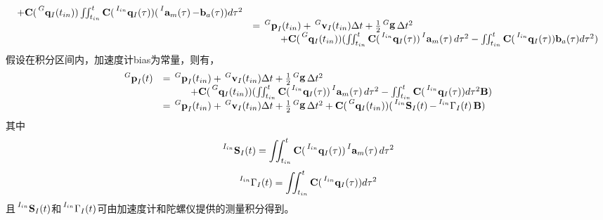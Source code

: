\documentclass{article}
\begin{document}
\begin{equation}
\begin{array}{ll}
        +\textbf{C}(\sideset{^G}{}{\mathop{\mathbf{q}_{I}(t_{in})}})
        \iint_{t_{in}}^{t}\textbf{C}(\sideset{^{I_{in}}}{}{\mathop{\mathbf{q}_{I}(\tau)}})
        (\sideset{^I}{}{\mathop{\mathbf{a}_{m}(\tau)}}-\textbf{b}_{a}(\tau))d{\tau}^2\\
        &=\sideset{^G}{}{\mathop{\textbf{p}_{I}}}(t_{in})+
        \sideset{^G}{}{\mathop{\textbf{v}_{I}}}(t_{in})\Delta{t}
        +\frac{1}{2}\sideset{^G}{}{\mathop{\mathbf{g}}}\Delta{t}^{2}\\
        &\hspace{1cm}+\textbf{C}(\sideset{^G}{}{\mathop{\mathbf{q}_{I}(t_{in})}})
        (\iint_{t_{in}}^{t}\textbf{C}(\sideset{^{I_{in}}}{}{\mathop{\mathbf{q}_{I}(\tau)}})
        \sideset{^I}{}{\mathop{\mathbf{a}_{m}(\tau)}}d{\tau}^2
        -\iint_{t_{in}}^{t}\textbf{C}(\sideset{^{I_{in}}}{}{\mathop{\mathbf{q}_{I}(\tau)}})
        \textbf{b}_{a}(\tau)d{\tau}^2)
    \end{array}
\end{equation}
假设在积分区间内，加速度计bias为常量，则有，
\begin{equation}\label{eqs:imuInG}
    \begin{array}{ll}
        \sideset{^G}{}{\mathop{\textbf{p}_{I}}}(t)
        &=\sideset{^G}{}{\mathop{\textbf{p}_{I}}}(t_{in})+
        \sideset{^G}{}{\mathop{\textbf{v}_{I}}}(t_{in})\Delta{t}
        +\frac{1}{2}\sideset{^G}{}{\mathop{\mathbf{g}}}\Delta{t}^{2}\\
        &\hspace{1cm}+\textbf{C}(\sideset{^G}{}{\mathop{\mathbf{q}_{I}(t_{in})}})
        (\iint_{t_{in}}^{t}\textbf{C}(\sideset{^{I_{in}}}{}{\mathop{\mathbf{q}_{I}(\tau)}})
        \sideset{^I}{}{\mathop{\mathbf{a}_{m}(\tau)}}d{\tau}^2
        -\iint_{t_{in}}^{t}\textbf{C}(\sideset{^{I_{in}}}{}{\mathop{\mathbf{q}_{I}(\tau)}})
        d{\tau}^2\textbf{B})\\
        &=\sideset{^G}{}{\mathop{\textbf{p}_{I}}}(t_{in})+
        \sideset{^G}{}{\mathop{\textbf{v}_{I}}}(t_{in})\Delta{t}
        +\frac{1}{2}\sideset{^G}{}{\mathop{\mathbf{g}}}\Delta{t}^{2}
        +\textbf{C}(\sideset{^G}{}{\mathop{\mathbf{q}_{I}(t_{in})}})
        (\sideset{^{I_{in}}}{}{\mathop{\textbf{S}_{I}(t)}}
        -\sideset{^{I_{in}}}{}{\mathop{{\Gamma}_{I}(t)}}\textbf{B})
    \end{array}
\end{equation}
其中
\begin{equation}
    \sideset{^{I_{in}}}{}{\mathop{\textbf{S}_{I}(t)}}=\iint_{t_{in}}^{t}\textbf{C}(\sideset{^{I_{in}}}{}{\mathop{\mathbf{q}_{I}(\tau)}})
    \sideset{^I}{}{\mathop{\mathbf{a}_{m}(\tau)}}d{\tau}^2
\end{equation}
\begin{equation}
    \sideset{^{I_{in}}}{}{\mathop{{\Gamma}_{I}(t)}}=\iint_{t_{in}}^{t}\textbf{C}(\sideset{^{I_{in}}}{}{\mathop{\mathbf{q}_{I}(\tau)}})
    d{\tau}^2
\end{equation}
且$\sideset{^{I_{in}}}{}{\mathop{\textbf{S}_{I}(t)}}$和$\sideset{^{I_{in}}}{}{\mathop{{\Gamma}_{I}(t)}}$可由加速度计和陀螺仪提供的测量积分得到。
\end{document}
